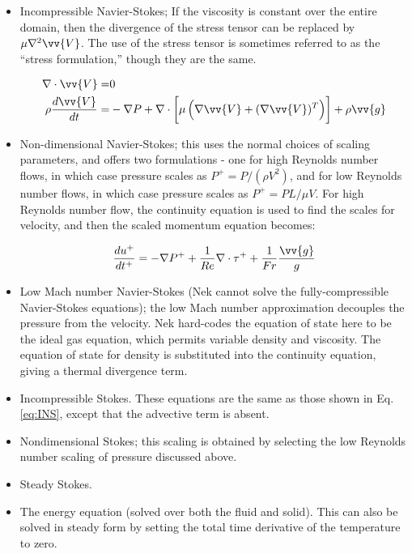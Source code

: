 \documentclass[10pt]{article}
\newcommand{\beq}{\begin{equation}}
\newcommand{\eeq}{\end{equation}}
\newcommand{\beqa}{\begin{equation}\begin{aligned}}
\newcommand{\eeqa}{\end{aligned}\end{equation}}
\numberwithin{equation}{section} %
\begin{document}
\begin{itemize}
\item Incompressible Navier-Stokes; If the viscosity is constant over the entire domain, then the divergence of the stress tensor can be replaced by \(\mu\nabla^2\vv{V}\). The use of the stress tensor is sometimes referred to as the ``stress formulation,'' though they are the same. 

\beqa
\label{eq:INS}
\nabla\cdot\vv{V}=&0\\
\rho\frac{d\vv{V}}{dt}=&-\nabla P+\nabla\cdot\left\lbrack\mu\left(\nabla\vv{V}+(\nabla\vv{V})^T\right)\right\rbrack+\rho\vv{g}\\
\eeqa

\item Non-dimensional Navier-Stokes; this uses the normal choices of scaling parameters, and offers two formulations - one for high Reynolds number flows, in which case pressure scales as \(P^{+}=P/(\rho V^2)\), and for low Reynolds number flows, in which case pressure scales as \(P^{+}=PL/\mu V\). For high Reynolds number flow, the continuity equation is used to find the scales for velocity, and then the scaled momentum equation becomes:

\beq
\frac{du^{+}}{dt^+}=-\nabla P^++\frac{1}{Re}\nabla\cdot\tau^++\frac{1}{Fr}\frac{\vv{g}}{g}
\eeq

\item Low Mach number Navier-Stokes (Nek cannot solve the fully-compressible Navier-Stokes equations); the low Mach number approximation decouples the pressure from the velocity. Nek hard-codes the equation of state here to be the ideal gas equation, which permits variable density and viscosity. The equation of state for density is substituted into the continuity equation, giving a thermal divergence term. 

\item Incompressible Stokes. These equations are the same as those shown in Eq. \eqref{eq:INS}, except that the advective term is absent. 

\item Nondimensional Stokes; this scaling is obtained by selecting the low Reynolds number scaling of pressure discussed above.

\item Steady Stokes.
 
\item The energy equation (solved over both the fluid and solid). This can also be solved in steady form by setting the total time derivative of the temperature to zero.


\end{itemize}
\end{document}
